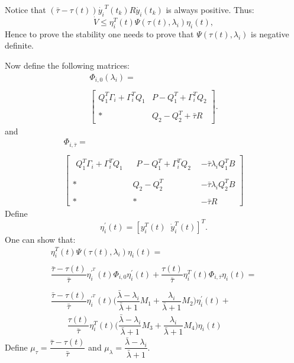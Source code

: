 \documentclass[conference]{IEEEtran}
\begin{document}
Notice that  $(\bar{\tau}-\tau(t))\dot{y_i}^T(t_k)R\dot{y_i}(t_k)$ is always positive. Thus:
\begin{equation}
\dot{V}\leq \eta_i^T(t)\Psi(\tau(t),\lambda_i) \eta_i(t),
\end{equation}
Hence to prove the stability one needs to prove that $\Psi(\tau(t),\lambda_i)$ is negative definite.

Now define the following matrices:
\begin{equation}\label{phi_0}
\begin{array}{c}
\Phi_{i,0}(\lambda_i)= \\~\\ \left[\begin{array}{cc}
 Q_{1}^T\Gamma_i +\Gamma_i^TQ_{1}  &  P-Q_{1}^T +\Gamma_i^TQ_{2}  \\~\\
 * &  Q_{2}-Q_{2}^T +\bar{\tau}R
\end{array} \right]. \end{array}
\end{equation}
and
\begin{equation}\label{phi_tau}
\begin{array}{c}
\Phi_{i,\bar{\tau}}= \\~\\ \left[\begin{array}{ccc}
 \begin{array}{c} Q_{1}^T \Gamma_i+ \Gamma_i^TQ_{1}\end{array} & \begin{array}{c} P-Q_{1}^T+ \Gamma_i^TQ_{2} \end{array} &-\bar{\tau}\lambda_i Q_{1}^T  B  \\~\\
 *& Q_{2}-Q_{2}^T &-\bar{\tau}\lambda_i Q_{2}^T  B \\~\\
 * &* & -\bar{\tau}R
\end{array} \right]\end{array}
\end{equation}
Define $$\eta^\prime_{i}(t)=[y^T_i(t)\;\; \dot{y}^T_i(t)]^T.$$ One can show that:
\begin{equation}
\begin{array}{lll}
 \eta^T_i(t)\Psi(\tau(t),\lambda_i)\eta_i(t) = \\~\\ \dfrac{\bar{\tau}-\tau(t)}{\bar\tau}\eta^{\prime^T}_{i}(t)\Phi_{i,0}\eta^{\prime}_{i}(t)+  \dfrac{\tau(t)}{\bar\tau}\eta^T_{i}(t)\Phi_{i,\bar{\tau}}\eta_{i}(t) = \\~\\ \dfrac{\bar{\tau}-\tau(t)}{\bar\tau}\eta^{\prime^T}_{i}(t)\Big(\dfrac{\bar{\lambda}-\lambda_i}{\bar\lambda+1}M_1+ \dfrac{\lambda_i}{\bar\lambda+1}M_2\Big)\eta^{\prime}_{i}(t)+ \\
 \qquad \dfrac{\tau(t)}{\bar\tau}\eta^T_{i}(t)\Big(\dfrac{\bar{\lambda}-\lambda_i}{\bar\lambda+1}M_3 +\dfrac{\lambda_i}{\bar\lambda+1}M_4\Big)\eta_{i}(t)
\end{array}
\end{equation}
Define $\mu_\tau=\dfrac{\bar{\tau}-\tau(t)}{\bar\tau}$ and $\mu_\lambda=\dfrac{\bar{\lambda}-\lambda_i}{\bar\lambda+1}$.
\end{document}
